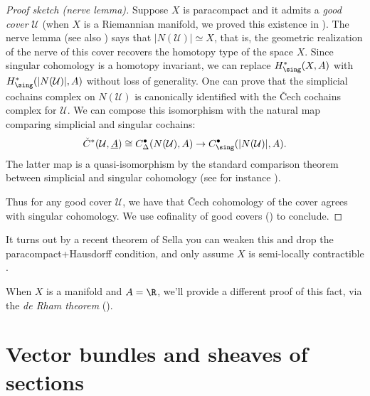 \documentclass[11pt]{book}
\begin{document}
\begin{proof}[Proof sketch (nerve lemma)]
Suppose $X$ is paracompact and it admits a \emph{good cover} $\mathcal{U}$ (when $X$ is a Riemannian manifold, we proved this existence in ). The nerve lemma \cite[\S5]{weilTheoremesRham1952} (see also \cite[4G.3]{Hatcher}) says that $|N(\mathcal{U})| \simeq X$, that is, the geometric realization of the nerve of this cover recovers the homotopy type of the space $X$. Since singular cohomology is a homotopy invariant, we can replace $H^\ast_\sing(X,A)$ with $H^\ast_\sing(|N(\mathcal{U})|,A)$ without loss of generality. One can prove that the simplicial cochains complex on $N(\mathcal{U})$ is canonically identified with the \v{C}ech cochains complex for $\mathcal{U}$. We can compose this isomorphism with the natural map comparing simplicial and singular cochains:
\begin{align*}
    \check{C}^\ast(\mathcal{U},\underline{A}) \cong C_\Delta^\bullet(N(\mathcal{U}),A) \to C_\sing^\bullet(|N(\mathcal{U})|,A).
\end{align*}
The latter map is a quasi-isomorphism by the standard comparison theorem between simplicial and singular cohomology (see for instance \cite[\S2.1]{Hatcher}).

Thus for any good cover $\mathcal{U}$, we have that \v{C}ech cohomology of the cover agrees with singular cohomology. We use cofinality of good covers () to conclude.
\end{proof}

\begin{remark} It turns out by a recent theorem of Sella you can weaken this and drop the paracompact+Hausdorff condition, and only assume $X$ is semi-locally contractible \cite{Sella-sheaf-cohomology}.
\end{remark}

\begin{remark} When $X$ is a manifold and $A=\R$, we'll provide a different proof of this fact, via the \emph{de Rham theorem} ().
\end{remark}

\newpage
\section{Vector bundles and sheaves of sections}
\end{document}
